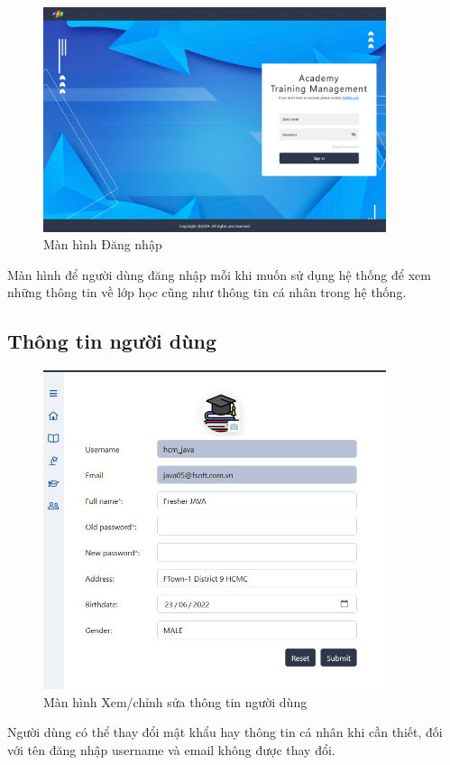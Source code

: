 \documentclass[report.tex]{subfiles}
\begin{document}
\begin{figure}[!htb]
{\centering
\includegraphics[width=380px]{../meta/ui.login.png}
\caption{Màn hình Đăng nhập}
\par
}
\end{figure}
\FloatBarrier

Màn hình để người dùng đăng nhập mỗi khi muốn sử dụng hệ thống để
xem những thông tin về lớp học cũng như thông tin cá nhân trong hệ thống.

\subsection{Thông tin người dùng}

\begin{figure}[!htb]
{\centering
\includegraphics[width=380px]{../meta/ui.user-info.png}
\caption{Màn hình Xem/chỉnh sửa thông tin người dùng}
\par
}
\end{figure}
\FloatBarrier

Người dùng có thể thay đổi mật khẩu hay thông tin cá nhân khi cần thiết,
đối với tên đăng nhập username và email không được thay đổi.
\end{document}

